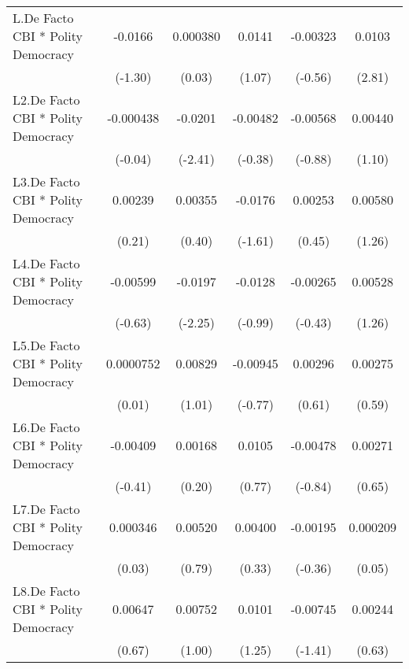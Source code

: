 {\begin{longtable}{l*{5}{c}}
\addlinespace
L.De Facto CBI * Polity Democracy&  -0.0166         & 0.000380         &   0.0141         & -0.00323         &   0.0103\sym{**} \\
                &  (-1.30)         &   (0.03)         &   (1.07)         &  (-0.56)         &   (2.81)         \\
\addlinespace
L2.De Facto CBI * Polity Democracy&-0.000438         &  -0.0201\sym{*}  & -0.00482         & -0.00568         &  0.00440         \\
                &  (-0.04)         &  (-2.41)         &  (-0.38)         &  (-0.88)         &   (1.10)         \\
\addlinespace
L3.De Facto CBI * Polity Democracy&  0.00239         &  0.00355         &  -0.0176         &  0.00253         &  0.00580         \\
                &   (0.21)         &   (0.40)         &  (-1.61)         &   (0.45)         &   (1.26)         \\
\addlinespace
L4.De Facto CBI * Polity Democracy& -0.00599         &  -0.0197\sym{*}  &  -0.0128         & -0.00265         &  0.00528         \\
                &  (-0.63)         &  (-2.25)         &  (-0.99)         &  (-0.43)         &   (1.26)         \\
\addlinespace
L5.De Facto CBI * Polity Democracy&0.0000752         &  0.00829         & -0.00945         &  0.00296         &  0.00275         \\
                &   (0.01)         &   (1.01)         &  (-0.77)         &   (0.61)         &   (0.59)         \\
\addlinespace
L6.De Facto CBI * Polity Democracy& -0.00409         &  0.00168         &   0.0105         & -0.00478         &  0.00271         \\
                &  (-0.41)         &   (0.20)         &   (0.77)         &  (-0.84)         &   (0.65)         \\
\addlinespace
L7.De Facto CBI * Polity Democracy& 0.000346         &  0.00520         &  0.00400         & -0.00195         & 0.000209         \\
                &   (0.03)         &   (0.79)         &   (0.33)         &  (-0.36)         &   (0.05)         \\
\addlinespace
L8.De Facto CBI * Polity Democracy&  0.00647         &  0.00752         &   0.0101         & -0.00745         &  0.00244         \\
                &   (0.67)         &   (1.00)         &   (1.25)         &  (-1.41)         &   (0.63)         \\

\end{longtable}}
